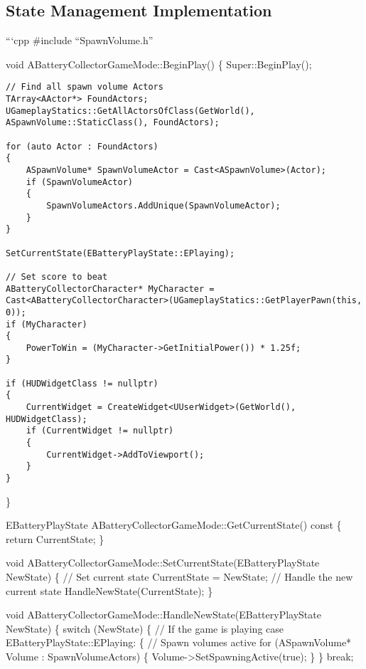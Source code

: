 \documentclass[
  letterpaper,
  DIV=11,
  numbers=noendperiod]{scrartcl}
\begin{document}
\subsection{State Management
Implementation}\label{state-management-implementation}

```cpp \#include ``SpawnVolume.h''

void ABatteryCollectorGameMode::BeginPlay() \{ Super::BeginPlay();

\begin{verbatim}
// Find all spawn volume Actors
TArray<AActor*> FoundActors;
UGameplayStatics::GetAllActorsOfClass(GetWorld(), ASpawnVolume::StaticClass(), FoundActors);

for (auto Actor : FoundActors)
{
    ASpawnVolume* SpawnVolumeActor = Cast<ASpawnVolume>(Actor);
    if (SpawnVolumeActor)
    {
        SpawnVolumeActors.AddUnique(SpawnVolumeActor);
    }
}

SetCurrentState(EBatteryPlayState::EPlaying);

// Set score to beat
ABatteryCollectorCharacter* MyCharacter = Cast<ABatteryCollectorCharacter>(UGameplayStatics::GetPlayerPawn(this, 0));
if (MyCharacter)
{
    PowerToWin = (MyCharacter->GetInitialPower()) * 1.25f;
}

if (HUDWidgetClass != nullptr)
{
    CurrentWidget = CreateWidget<UUserWidget>(GetWorld(), HUDWidgetClass);
    if (CurrentWidget != nullptr)
    {
        CurrentWidget->AddToViewport();
    }
}
\end{verbatim}

\}

EBatteryPlayState ABatteryCollectorGameMode::GetCurrentState() const \{
return CurrentState; \}

void ABatteryCollectorGameMode::SetCurrentState(EBatteryPlayState
NewState) \{ // Set current state CurrentState = NewState; // Handle the
new current state HandleNewState(CurrentState); \}

void ABatteryCollectorGameMode::HandleNewState(EBatteryPlayState
NewState) \{ switch (NewState) \{ // If the game is playing case
EBatteryPlayState::EPlaying: \{ // Spawn volumes active for
(ASpawnVolume* Volume : SpawnVolumeActors) \{
Volume-\textgreater SetSpawningActive(true); \} \} break;
\end{document}
